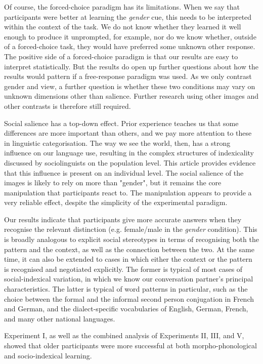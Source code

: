 \documentclass{frontiersSCNS} %
\begin{document}
Of course, the forced-choice paradigm has its limitations. When we say that participants were better at learning the \emph{gender} cue, this needs to be interpreted within the context of the task.  We do not know whether they learned it well enough to produce it unprompted, for example,  nor do we know whether, outside of a forced-choice task, they would have preferred some unknown other response.  The positive side of a forced-choice paradigm is that our results are easy to interpret statistically.  But the results do open up further questions about how the results would pattern if a free-response paradigm was used.  As we only contrast gender and view, a further question is whether these two conditions may vary on unknown dimensions other than salience.  Further research using other images and other contrasts is therefore still required.  

Social salience has a top-down effect. Prior experience teaches us that some differences are more important than others, and we pay more attention to these in linguistic categorisation. The way we see the world, then, has a strong influence on our language use, resulting in the complex structures of indexicality discussed by sociolinguists on the population level. This article provides evidence that this influence is present on an individual level.  The social salience of the images is likely to rely on more than "gender", but it remains the core manipulation that participants react to. The manipulation appears to provide a very reliable effect, despite the simplicity of the experimental paradigm.

Our results indicate that participants give more accurate answers when they recognise the relevant distinction (e.g. female/male in the \emph{gender} condition). This is broadly analogous to explicit social stereotypes in terms of recognising both the pattern and the context, as well as the connection between the two. At the same time, it can also be extended to cases in which either the context or the pattern is recognised and negotiated explicitly. The former is typical of most cases of social-indexical variation, in which we know our conversation partner's principal characteristics. The latter is typical of word patterns in particular, such as the choice between the formal and the informal second person conjugation in French and German, and the dialect-specific vocabularies of English, German, French, and many other national languages.



Experiment I, as well as the combined analysis of Experiments II, III, and V, showed that older participants were more successful at both morpho-phonological and socio-indexical learning.
\end{document}

